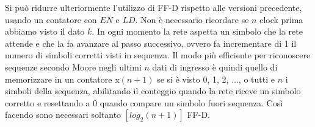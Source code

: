 \documentclass{subfiles}
\begin{document}
Si può ridurre ulteriormente l'utilizzo di FF-D rispetto alle versioni precedente, usando un contatore con $EN$ e $LD$.
Non è necessario ricordare se $n$ clock prima abbiamo visto il dato $k$.
In ogni momento la rete aspetta un simbolo che la rete attende e che la fa avanzare al passo successivo, ovvero fa incrementare di 1 il numero di simboli corretti visti in sequenza.
Il modo più efficiente per riconoscere sequenze secondo Moore negli ultimi $n$ dati di ingresso è quindi quello di memorizzare in un contatore x$(n+1)$ se si è visto 0, 1, 2, $\dots$, o tutti e $n$ i simboli della sequenza, abilitando il conteggio quando la rete riceve un simbolo corretto e resettando a 0 quando compare un simbolo fuori sequenza.
Così facendo sono necessari soltanto $[log_2 (n+1)]$ FF-D.
\end{document}
